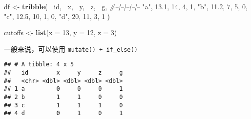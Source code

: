 \documentclass[
]{krantz}
\makeatletter
\newenvironment{Shaded}{\begin{snugshade}}{\end{snugshade}}
\newcommand{\CommentTok}[1]{\textcolor[rgb]{0.37,0.37,0.37}{\textit{#1}}}
\newcommand{\DataTypeTok}[1]{\textcolor[rgb]{0.27,0.27,0.27}{#1}}
\newcommand{\DecValTok}[1]{\textcolor[rgb]{0.06,0.06,0.06}{#1}}
\newcommand{\FloatTok}[1]{\textcolor[rgb]{0.06,0.06,0.06}{#1}}
\newcommand{\KeywordTok}[1]{\textcolor[rgb]{0.27,0.27,0.27}{\textbf{#1}}}
\newcommand{\NormalTok}[1]{#1}
\newcommand{\OperatorTok}[1]{\textcolor[rgb]{0.43,0.43,0.43}{\textbf{#1}}}
\newcommand{\StringTok}[1]{\textcolor[rgb]{0.5,0.5,0.5}{#1}}
\newenvironment{kframe}{%
\medskip{}
\setlength{\fboxsep}{.8em}
 \def\at@end@of@kframe{}%
 \ifinner\ifhmode%
  \def\at@end@of@kframe{\end{minipage}}%
  \begin{minipage}{\columnwidth}%
 \fi\fi%
 \def\FrameCommand##1{\hskip\@totalleftmargin \hskip-\fboxsep
 \colorbox{shadecolor}{##1}\hskip-\fboxsep
     \hskip-\linewidth \hskip-\@totalleftmargin \hskip\columnwidth}%
 \MakeFramed {\advance\hsize-\width
   \@totalleftmargin\z@ \linewidth\hsize
   \@setminipage}}%
 {\par\unskip\endMakeFramed%
 \at@end@of@kframe}
\renewenvironment{Shaded}{\begin{kframe}}{\end{kframe}}
\makeatother
\begin{document}
\begin{Shaded}
\begin{Highlighting}[]
\NormalTok{df <-}\StringTok{ }\KeywordTok{tribble}\NormalTok{(}
   \OperatorTok{~}\NormalTok{id, }\OperatorTok{~}\NormalTok{x, }\OperatorTok{~}\NormalTok{y, }\OperatorTok{~}\NormalTok{z, }\OperatorTok{~}\NormalTok{g,}
   \CommentTok{#--|--|--|--|--}
   \StringTok{"a"}\NormalTok{, }\FloatTok{13.1}\NormalTok{, }\DecValTok{14}\NormalTok{, }\DecValTok{4}\NormalTok{, }\DecValTok{1}\NormalTok{,}
   \StringTok{"b"}\NormalTok{, }\FloatTok{11.2}\NormalTok{, }\DecValTok{7}\NormalTok{, }\DecValTok{5}\NormalTok{, }\DecValTok{0}\NormalTok{,}
   \StringTok{"c"}\NormalTok{, }\FloatTok{12.5}\NormalTok{, }\DecValTok{10}\NormalTok{, }\DecValTok{1}\NormalTok{, }\DecValTok{0}\NormalTok{,}
   \StringTok{"d"}\NormalTok{, }\DecValTok{20}\NormalTok{, }\DecValTok{11}\NormalTok{, }\DecValTok{3}\NormalTok{, }\DecValTok{1}
\NormalTok{   )}
   
\NormalTok{cutoffs <-}\StringTok{ }\KeywordTok{list}\NormalTok{(}\DataTypeTok{x =} \DecValTok{13}\NormalTok{, }\DataTypeTok{y =} \DecValTok{12}\NormalTok{, }\DataTypeTok{z =} \DecValTok{3}\NormalTok{)}
\end{Highlighting}
\end{Shaded}

一般来说，可以使用 \texttt{mutate()\ +\ if\_else()}

\begin{Shaded}
\end{Shaded}

\begin{verbatim}
## # A tibble: 4 x 5
##   id        x     y     z     g
##   <chr> <dbl> <dbl> <dbl> <dbl>
## 1 a         0     0     0     1
## 2 b         1     1     0     0
## 3 c         1     1     1     0
## 4 d         0     1     0     1
\end{verbatim}
\end{document}
